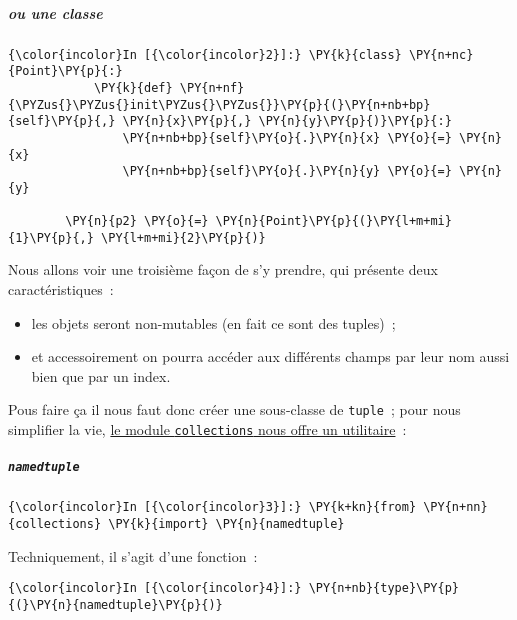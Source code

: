     \hypertarget{ou-une-classe}{%
\subparagraph{ou une classe}\label{ou-une-classe}}

    \begin{Verbatim}[commandchars=\\\{\},frame=single,framerule=0.3mm,rulecolor=\color{cellframecolor}]
{\color{incolor}In [{\color{incolor}2}]:} \PY{k}{class} \PY{n+nc}{Point}\PY{p}{:}
            \PY{k}{def} \PY{n+nf}{\PYZus{}\PYZus{}init\PYZus{}\PYZus{}}\PY{p}{(}\PY{n+nb+bp}{self}\PY{p}{,} \PY{n}{x}\PY{p}{,} \PY{n}{y}\PY{p}{)}\PY{p}{:}
                \PY{n+nb+bp}{self}\PY{o}{.}\PY{n}{x} \PY{o}{=} \PY{n}{x}
                \PY{n+nb+bp}{self}\PY{o}{.}\PY{n}{y} \PY{o}{=} \PY{n}{y}
        
        \PY{n}{p2} \PY{o}{=} \PY{n}{Point}\PY{p}{(}\PY{l+m+mi}{1}\PY{p}{,} \PY{l+m+mi}{2}\PY{p}{)}
\end{Verbatim}


    Nous allons voir une troisième façon de s'y prendre, qui présente deux
caractéristiques~:

\begin{itemize}
\tightlist
\item
  les objets seront non-mutables (en fait ce sont des tuples)~;
\item
  et accessoirement on pourra accéder aux différents champs par leur nom
  aussi bien que par un index.
\end{itemize}

    Pous faire ça il nous faut donc créer une sous-classe de
\texttt{tuple}~; pour nous simplifier la vie,
\href{https://docs.python.org/3/library/collections.html\#collections.namedtuple}{le
module \texttt{collections} nous offre un utilitaire}~:

    \hypertarget{namedtuple}{%
\subparagraph{\texorpdfstring{\texttt{namedtuple}}{namedtuple}}\label{namedtuple}}

    \begin{Verbatim}[commandchars=\\\{\},frame=single,framerule=0.3mm,rulecolor=\color{cellframecolor}]
{\color{incolor}In [{\color{incolor}3}]:} \PY{k+kn}{from} \PY{n+nn}{collections} \PY{k}{import} \PY{n}{namedtuple}
\end{Verbatim}


    Techniquement, il s'agit d'une fonction~:

    \begin{Verbatim}[commandchars=\\\{\},frame=single,framerule=0.3mm,rulecolor=\color{cellframecolor}]
{\color{incolor}In [{\color{incolor}4}]:} \PY{n+nb}{type}\PY{p}{(}\PY{n}{namedtuple}\PY{p}{)}
\end{Verbatim}


